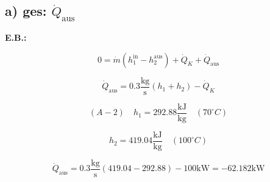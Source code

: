 \subsection*{a) ges: $\dot{Q}_{\text{aus}}$}

\textbf{E.B.:}

\[
0 = \dot{m} (h_1^{\text{in}} - h_2^{\text{aus}}) + \dot{Q}_K + \dot{Q}_{\text{aus}}
\]

\[
\dot{Q}_{\text{aus}} = 0.3 \frac{\text{kg}}{\text{s}} (h_1 + h_2) - \dot{Q}_K
\]

\[
(A-2) \quad h_1 = 292.88 \frac{\text{kJ}}{\text{kg}} \quad (70^\circ C)
\]

\[
h_2 = 419.04 \frac{\text{kJ}}{\text{kg}} \quad (100^\circ C)
\]

\[
\dot{Q}_{\text{aus}} = 0.3 \frac{\text{kg}}{\text{s}} (419.04 - 292.88) - 100 \text{kW} = -62.182 \text{kW}
\]